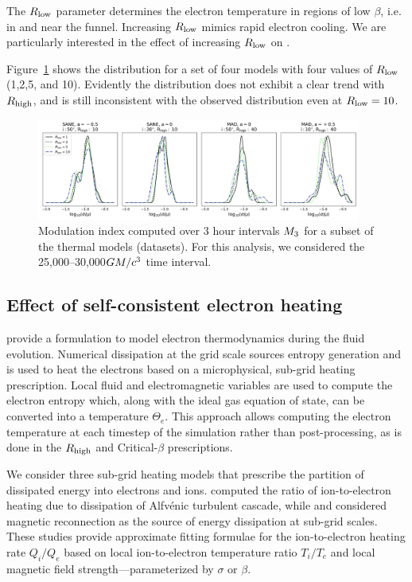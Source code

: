 The $R_\mathrm{low}$ parameter determines the electron temperature in regions of low $\beta$, i.e. in and near the funnel.
Increasing $R_\mathrm{low}$ mimics rapid electron cooling.
We are particularly interested in the effect of increasing $R_\mathrm{low}$ on .

Figure~\ref{fig:mi_rlow} shows the  distribution for a set of four \kharma models with four values of $R_\mathrm{low}$ (1,2,5, and 10).
Evidently the  distribution does not exhibit a clear trend with $R_\mathrm{high}$, and is still inconsistent with the observed distribution even at $R_\mathrm{low} = 10$.

\begin{figure}
  \centering
  \includegraphics[width=0.95\textwidth]{figures/mi_rlow_select_models.png}
  \caption{Modulation index computed over 3 hour intervals $M_{3}$ for a subset of the thermal models (\kharma datasets).
For this analysis, we considered the 25,000--30,000$GM/c^3$ time interval.}
  \label{fig:mi_rlow}
\end{figure}

\subsection{Effect of self-consistent electron heating}

\citealt{2015MNRAS.454.1848R} provide a formulation to model electron thermodynamics during the fluid evolution.
Numerical dissipation at the grid scale sources entropy generation and is used to heat the electrons based on a microphysical, sub-grid heating prescription.
Local fluid and electromagnetic variables are used to compute the electron entropy which, along with the ideal gas equation of state, can be converted into a temperature $\Theta_{e}$.
This approach allows computing the electron temperature at each timestep of the simulation rather than post-processing, as is done in the $R_\mathrm{high}$ and Critical-$\beta$ prescriptions.

We consider three sub-grid heating models that prescribe the partition of dissipated energy into electrons and ions.
\cite{2010MNRAS.409L.104H} computed the ratio of ion-to-electron heating due to dissipation of Alfv\'enic turbulent cascade, while \cite{10.1093/mnras/stx2530} and \cite{Rowan_2017} considered magnetic reconnection as the source of energy dissipation at sub-grid scales.
These studies provide approximate fitting formulae for the ion-to-electron heating rate $Q_{i}/Q_{e}$ based on local ion-to-electron temperature ratio $T_{i}/T_{e}$ and local magnetic field strength---parameterized by $\sigma$ or $\beta$.

